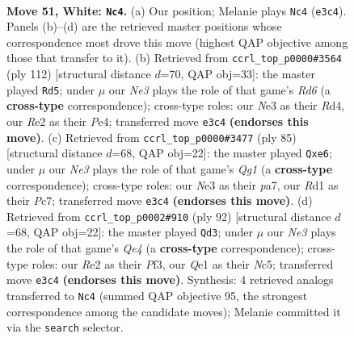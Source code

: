 \documentclass[11pt]{article}
\begin{document}
\clearpage

\begin{figure}[p]\centering
\begin{subfigure}{0.46\textwidth}\centering
\resizebox{\linewidth}{!}{%
\newchessgame
\chessboard[
  setfen={r7/3n3k/1q6/1P5p/p2pr3/P3N3/4R3/3RQ1K1 w - - 0 51},
  showmover=false,
  pgfstyle=straightmove, color=movearrow, markmove={e3-c4}
]}
\caption{}
\end{subfigure}\hfill
\begin{subfigure}{0.46\textwidth}\centering
\resizebox{\linewidth}{!}{%
\newchessgame
\chessboard[
  setfen={4r3/5r1k/3R1p2/2q3p1/3RP1Pp/7P/8/3Q2K1 w - - 5 57},
  showmover=false,
  pgfstyle=straightmove, color=movearrow, markmove={d6-d5}
]}
\caption{}
\end{subfigure}
\\[4pt]
\begin{subfigure}{0.46\textwidth}\centering
\resizebox{\linewidth}{!}{%
\newchessgame
\chessboard[
  setfen={r5qk/P1p5/2p1Q3/5r2/7P/R5P1/5n1K/4R3 b - - 4 43},
  showmover=false,
  pgfstyle=straightmove, color=movearrow, markmove={g8-e6}
]}
\caption{}
\end{subfigure}\hfill
\begin{subfigure}{0.46\textwidth}\centering
\resizebox{\linewidth}{!}{%
\newchessgame
\chessboard[
  setfen={k4r2/pp6/3nR1K1/2N5/4Q3/5PP1/P7/3q4 w - - 7 47},
  showmover=false,
  pgfstyle=straightmove, color=movearrow, markmove={e4-d3}
]}
\caption{}
\end{subfigure}
\caption{\textbf{Move 51, White: \texttt{Nc4}.} (a) Our position; Melanie plays \texttt{Nc4} (\texttt{e3c4}). Panels (b)--(d) are the retrieved master positions whose correspondence most drove this move (highest QAP objective among those that transfer to it). (b) Retrieved from \texttt{ccrl\_top\_p0000\#3564} (ply 112) [structural distance $d$=70, QAP obj=33]: the master played \texttt{Rd5}; under $\mu$ our \emph{Ne3} plays the role of that game's \emph{Rd6} (a \textbf{cross-type} correspondence); cross-type roles: our \emph{N}e3 as their \emph{R}d4, our \emph{R}e2 as their \emph{P}e4; transferred move \texttt{e3c4} \textbf{(endorses this move)}. (c) Retrieved from \texttt{ccrl\_top\_p0000\#3477} (ply 85) [structural distance $d$=68, QAP obj=22]: the master played \texttt{Qxe6}; under $\mu$ our \emph{Ne3} plays the role of that game's \emph{Qg1} (a \textbf{cross-type} correspondence); cross-type roles: our \emph{N}e3 as their \emph{p}a7, our \emph{R}d1 as their \emph{P}c7; transferred move \texttt{e3c4} \textbf{(endorses this move)}. (d) Retrieved from \texttt{ccrl\_top\_p0002\#910} (ply 92) [structural distance $d$=68, QAP obj=22]: the master played \texttt{Qd3}; under $\mu$ our \emph{Ne3} plays the role of that game's \emph{Qe4} (a \textbf{cross-type} correspondence); cross-type roles: our \emph{R}e2 as their \emph{P}f3, our \emph{Q}e1 as their \emph{N}c5; transferred move \texttt{e3c4} \textbf{(endorses this move)}. Synthesis: 4 retrieved analogs transferred to \texttt{Nc4} (summed QAP objective 95, the strongest correspondence among the candidate moves); Melanie committed it via the \texttt{search} selector.}
\label{fig:thought-m100}
\end{figure}
\end{document}
